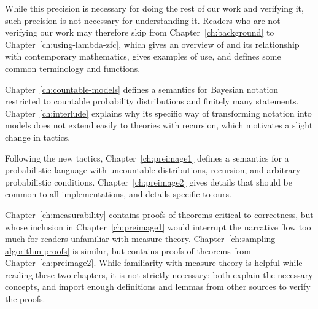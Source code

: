 While this precision is necessary for doing the rest of our work and verifying it, such precision is not necessary for understanding it.
Readers who are not verifying our work may therefore skip from Chapter~\ref{ch:background} to Chapter~\ref{ch:using-lambda-zfc}, which gives an overview of \lzfclang and its relationship with contemporary mathematics, gives examples of use, and defines some common terminology and functions.

Chapter~\ref{ch:countable-models} defines a semantics for Bayesian notation restricted to countable probability distributions and finitely many statements.
Chapter~\ref{ch:interlude} explains why its specific way of transforming notation into models does not extend easily to theories with recursion, which motivates a slight change in tactics.

Following the new tactics, Chapter~\ref{ch:preimage1} defines a semantics for a probabilistic language with uncountable distributions, recursion, and arbitrary probabilistic conditions.
Chapter~\ref{ch:preimage2} gives details that should be common to all implementations, and details specific to ours.

Chapter~\ref{ch:measurability} contains proofs of theorems critical to correctness, but whose inclusion in Chapter~\ref{ch:preimage1} would interrupt the narrative flow too much for readers unfamiliar with measure theory.
Chapter~\ref{ch:sampling-algorithm-proofs} is similar, but contains proofs of theorems from Chapter~\ref{ch:preimage2}.
While familiarity with measure theory is helpful while reading these two chapters, it is not strictly necessary: both explain the necessary concepts, and import enough definitions and lemmas from other sources to verify the proofs.



